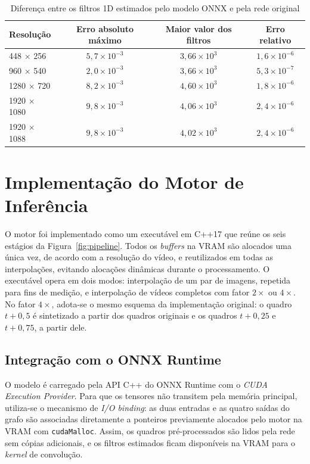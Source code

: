 \documentclass[
    12pt,                %
    openright,           %
    oneside,             %
    a4paper,             %
    english,             %
    brazil               %
]{abntex2}
\begin{document}
\begin{table}[H]
\centering
\caption{Diferença entre os filtros 1D estimados pelo modelo ONNX e pela rede original}
\label{tab:validacao_onnx}
\begin{tabular}{lccc}
\toprule
\textbf{Resolução} & \textbf{Erro absoluto máximo} & \textbf{Maior valor dos filtros} & \textbf{Erro relativo} \\
\midrule
448 $\times$ 256   & $5{,}7 \times 10^{-3}$ & $3{,}66 \times 10^{3}$ & $1{,}6 \times 10^{-6}$ \\
960 $\times$ 540   & $2{,}0 \times 10^{-3}$ & $3{,}66 \times 10^{3}$ & $5{,}3 \times 10^{-7}$ \\
1280 $\times$ 720  & $8{,}2 \times 10^{-3}$ & $4{,}60 \times 10^{3}$ & $1{,}8 \times 10^{-6}$ \\
1920 $\times$ 1080 & $9{,}8 \times 10^{-3}$ & $4{,}06 \times 10^{3}$ & $2{,}4 \times 10^{-6}$ \\
1920 $\times$ 1088 & $9{,}8 \times 10^{-3}$ & $4{,}02 \times 10^{3}$ & $2{,}4 \times 10^{-6}$ \\
\bottomrule
\end{tabular}
\end{table}

\section{Implementação do Motor de Inferência}
\label{sec:implementacao_motor}

O motor foi implementado como um executável em C++17 que reúne os seis estágios da Figura~\ref{fig:pipeline}. Todos os \textit{buffers} na VRAM são alocados uma única vez, de acordo com a resolução do vídeo, e reutilizados em todas as interpolações, evitando alocações dinâmicas durante o processamento. O executável opera em dois modos: interpolação de um par de imagens, repetida para fins de medição, e interpolação de vídeos completos com fator $2\times$ ou $4\times$. No fator $4\times$, adota-se o mesmo esquema da implementação original: o quadro $t+0{,}5$ é sintetizado a partir dos quadros originais e os quadros $t+0{,}25$ e $t+0{,}75$, a partir dele.

\subsection{Integração com o ONNX Runtime}

O modelo é carregado pela API C++ do ONNX Runtime com o \textit{CUDA Execution Provider}. Para que os tensores não transitem pela memória principal, utiliza-se o mecanismo de \textit{I/O binding}: as duas entradas e as quatro saídas do grafo são associadas diretamente a ponteiros previamente alocados pelo motor na VRAM com \texttt{cudaMalloc}. Assim, os quadros pré-processados são lidos pela rede sem cópias adicionais, e os filtros estimados ficam disponíveis na VRAM para o \textit{kernel} de convolução.
\end{document}

